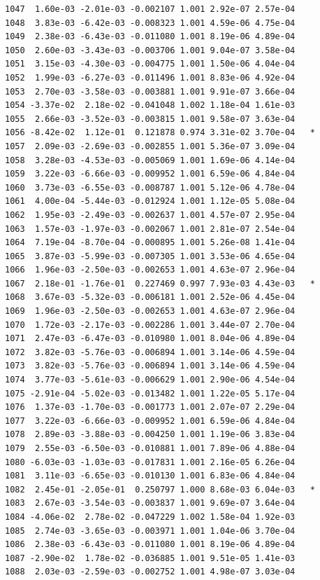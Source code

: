\documentclass[
  letterpaper,
  DIV=11,
  numbers=noendperiod]{scrartcl}
\begin{document}
\begin{verbatim}
1047  1.60e-03 -2.01e-03 -0.002107 1.001 2.92e-07 2.57e-04    
1048  3.83e-03 -6.42e-03 -0.008323 1.001 4.59e-06 4.75e-04    
1049  2.38e-03 -6.43e-03 -0.011080 1.001 8.19e-06 4.89e-04    
1050  2.60e-03 -3.43e-03 -0.003706 1.001 9.04e-07 3.58e-04    
1051  3.15e-03 -4.30e-03 -0.004775 1.001 1.50e-06 4.04e-04    
1052  1.99e-03 -6.27e-03 -0.011496 1.001 8.83e-06 4.92e-04    
1053  2.70e-03 -3.58e-03 -0.003881 1.001 9.91e-07 3.66e-04    
1054 -3.37e-02  2.18e-02 -0.041048 1.002 1.18e-04 1.61e-03    
1055  2.66e-03 -3.52e-03 -0.003815 1.001 9.58e-07 3.63e-04    
1056 -8.42e-02  1.12e-01  0.121878 0.974 3.31e-02 3.70e-04   *
1057  2.09e-03 -2.69e-03 -0.002855 1.001 5.36e-07 3.09e-04    
1058  3.28e-03 -4.53e-03 -0.005069 1.001 1.69e-06 4.14e-04    
1059  3.22e-03 -6.66e-03 -0.009952 1.001 6.59e-06 4.84e-04    
1060  3.73e-03 -6.55e-03 -0.008787 1.001 5.12e-06 4.78e-04    
1061  4.00e-04 -5.44e-03 -0.012924 1.001 1.12e-05 5.08e-04    
1062  1.95e-03 -2.49e-03 -0.002637 1.001 4.57e-07 2.95e-04    
1063  1.57e-03 -1.97e-03 -0.002067 1.001 2.81e-07 2.54e-04    
1064  7.19e-04 -8.70e-04 -0.000895 1.001 5.26e-08 1.41e-04    
1065  3.87e-03 -5.99e-03 -0.007305 1.001 3.53e-06 4.65e-04    
1066  1.96e-03 -2.50e-03 -0.002653 1.001 4.63e-07 2.96e-04    
1067  2.18e-01 -1.76e-01  0.227469 0.997 7.93e-03 4.43e-03   *
1068  3.67e-03 -5.32e-03 -0.006181 1.001 2.52e-06 4.45e-04    
1069  1.96e-03 -2.50e-03 -0.002653 1.001 4.63e-07 2.96e-04    
1070  1.72e-03 -2.17e-03 -0.002286 1.001 3.44e-07 2.70e-04    
1071  2.47e-03 -6.47e-03 -0.010980 1.001 8.04e-06 4.89e-04    
1072  3.82e-03 -5.76e-03 -0.006894 1.001 3.14e-06 4.59e-04    
1073  3.82e-03 -5.76e-03 -0.006894 1.001 3.14e-06 4.59e-04    
1074  3.77e-03 -5.61e-03 -0.006629 1.001 2.90e-06 4.54e-04    
1075 -2.91e-04 -5.02e-03 -0.013482 1.001 1.22e-05 5.17e-04    
1076  1.37e-03 -1.70e-03 -0.001773 1.001 2.07e-07 2.29e-04    
1077  3.22e-03 -6.66e-03 -0.009952 1.001 6.59e-06 4.84e-04    
1078  2.89e-03 -3.88e-03 -0.004250 1.001 1.19e-06 3.83e-04    
1079  2.55e-03 -6.50e-03 -0.010881 1.001 7.89e-06 4.88e-04    
1080 -6.03e-03 -1.03e-03 -0.017831 1.001 2.16e-05 6.26e-04    
1081  3.11e-03 -6.65e-03 -0.010130 1.001 6.83e-06 4.84e-04    
1082  2.45e-01 -2.05e-01  0.250797 1.000 8.68e-03 6.04e-03   *
1083  2.67e-03 -3.54e-03 -0.003837 1.001 9.69e-07 3.64e-04    
1084 -4.06e-02  2.78e-02 -0.047229 1.002 1.58e-04 1.92e-03    
1085  2.74e-03 -3.65e-03 -0.003971 1.001 1.04e-06 3.70e-04    
1086  2.38e-03 -6.43e-03 -0.011080 1.001 8.19e-06 4.89e-04    
1087 -2.90e-02  1.78e-02 -0.036885 1.001 9.51e-05 1.41e-03    
1088  2.03e-03 -2.59e-03 -0.002752 1.001 4.98e-07 3.03e-04    

\end{verbatim}
\end{document}
